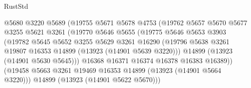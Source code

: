 \begin{lexlean}{RustStd}
\begin{coremodule}
                                    @5680
                                    @3220
                                    @5689
                                    (@19755
                                      @5671
                                      @5678
                                      @4753
                                      (@19762
                                        @5657
                                        @5670
                                        @5677
                                        @3255
                                        @5621
                                        @3261
                                        (@19770
                                          @5646
                                          @5655
                                          (@19775
                                            @5646
                                            @5653
                                            @3903
                                            (@19782
                                              @5645
                                              @5652
                                              @3255
                                              @5629
                                              @3261
                                              @16290
                                              (@19796
                                                @5638
                                                @3261
                                                @19807
                                                @16353
                                                @14899
                                                (@13923 (@14901 @5639 @3220)))
                                              @14899
                                              (@13923 (@14901 @5630 @5645)))
                                            @16368
                                            @16371
                                            @16374
                                            @16378
                                            @16383
                                            @16389))
                                        (@19458
                                          @5663
                                          @3261
                                          @19469
                                          @16353
                                          @14899
                                          (@13923 (@14901 @5664 @3220)))
                                        @14899
                                        (@13923 (@14901 @5622 @5670)))

\end{coremodule}
\end{lexlean}
